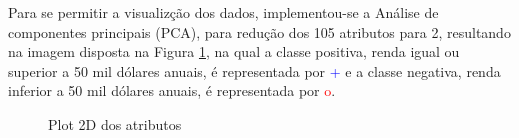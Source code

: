 Para se permitir a visualizção dos dados, implementou-se a Análise de componentes principais (PCA), para redução dos 105 atributos para 2, resultando na imagem disposta na Figura \ref{fig:dados2d}, na qual a classe positiva, renda igual ou superior a 50 mil dólares anuais, é representada por \textcolor{blue}{+} e a classe negativa, renda inferior a 50 mil dólares anuais, é representada por \textcolor{red}{o}.

\begin{figure}
\centering
{}
\caption{Plot 2D dos atributos}
\label{fig:dados2d}
\end{figure}




